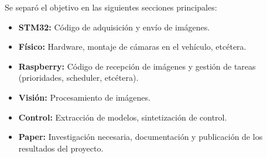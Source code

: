 Se separó el objetivo en las siguientes secciones principales:
\begin{itemize}
	\item \textbf{STM32:} Código de adquisición y envío de imágenes.
	\item \textbf{Físico:} Hardware, montaje de cámaras en el vehículo, etcétera.
	\item \textbf{Raspberry:} Código de recepción de imágenes y gestión de tareas (prioridades, scheduler, etcétera).
	\item \textbf{Visión:} Procesamiento de imágenes.
	\item \textbf{Control:} Extracción de modelos, sintetización de control.
	\item \textbf{Paper:} Investigación necesaria, documentación y publicación de los resultados del proyecto.
\end{itemize}
